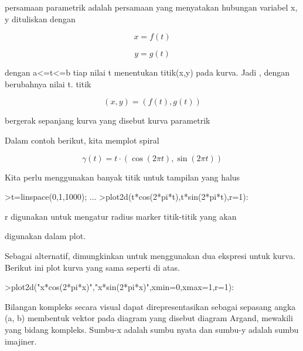 \documentclass[a4paper,10pt]{article}
\begin{document}
\begin{eulernotebook}
\begin{eulercomment}
\begin{eulercomment}
\begin{eulercomment}
\begin{eulercomment}
\begin{eulercomment}
\begin{eulercomment}
\begin{eulercomment}
persamaan parametrik adalah persamaan yang menyatakan hubungan
variabel x, y dituliskan dengan\\
\end{eulercomment}
\begin{eulerformula}
\[
x=f(t)
\]
\end{eulerformula}
\begin{eulerformula}
\[
y=g(t)
\]
\end{eulerformula}
\begin{eulercomment}
dengan a\textless{}=t\textless{}=b tiap nilai t menentukan titik(x,y) pada kurva. Jadi ,
dengan berubahnya nilai t. titik\\
\end{eulercomment}
\begin{eulerformula}
\[
(x,y) = (f(t),g(t))
\]
\end{eulerformula}
\begin{eulercomment}
bergerak sepanjang kurva yang disebut kurva parametrik


Dalam contoh berikut, kita memplot spiral

\end{eulercomment}
\begin{eulerformula}
\[
\gamma(t) = t \cdot (\cos(2\pi t),\sin(2\pi t))
\]
\end{eulerformula}
\begin{eulercomment}
Kita perlu menggunakan banyak titik untuk tampilan yang halus
\end{eulercomment}
\begin{eulerprompt}
>t=linspace(0,1,1000); ...
>plot2d(t*cos(2*pi*t),t*sin(2*pi*t),r=1):
\end{eulerprompt}
\begin{eulerttcomment}
 r digunakan untuk mengatur radius marker titik-titik yang akan
\end{eulerttcomment}
\begin{eulercomment}
digunakan dalam plot.



Sebagai alternatif, dimungkinkan untuk menggunakan dua ekspresi untuk
kurva. Berikut ini plot kurva yang sama seperti di atas.
\end{eulercomment}
\begin{eulerprompt}
>plot2d("x*cos(2*pi*x)","x*sin(2*pi*x)",xmin=0,xmax=1,r=1):
\end{eulerprompt}
\begin{eulercomment}
Bilangan kompleks secara visual dapat direpresentasikan sebagai
sepasang angka (a, b) membentuk vektor pada diagram yang disebut
diagram Argand, mewakili yang bidang kompleks. Sumbu-x adalah sumbu
nyata dan sumbu-y adalah sumbu imajiner.


\end{eulercomment}
\end{eulercomment}
\end{eulercomment}
\end{eulercomment}
\end{eulercomment}
\end{eulercomment}
\end{eulercomment}
\end{eulernotebook}
\end{document}
